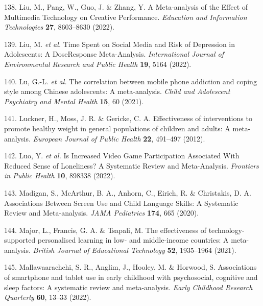 \documentclass[
  english,
  man]{apa6}
\newenvironment{cslreferences}%
  {}%
  {\par}
\begin{document}
\begin{cslreferences}
\leavevmode\hypertarget{ref-liuMetaanalysisEffectMultimedia2022}{}%
138. Liu, M., Pang, W., Guo, J. \& Zhang, Y. A Meta-analysis of the Effect of Multimedia Technology on Creative Performance. \emph{Education and Information Technologies} \textbf{27}, 8603--8630 (2022).

\leavevmode\hypertarget{ref-liuTimeSpentSocial2022}{}%
139. Liu, M. \emph{et al.} Time Spent on Social Media and Risk of Depression in Adolescents: A DoseResponse Meta-Analysis. \emph{International Journal of Environmental Research and Public Health} \textbf{19}, 5164 (2022).

\leavevmode\hypertarget{ref-luCorrelationMobilePhone2021}{}%
140. Lu, G.-L. \emph{et al.} The correlation between mobile phone addiction and coping style among Chinese adolescents: A meta-analysis. \emph{Child and Adolescent Psychiatry and Mental Health} \textbf{15}, 60 (2021).

\leavevmode\hypertarget{ref-lucknerEffectivenessInterventionsPromote2012}{}%
141. Luckner, H., Moss, J. R. \& Gericke, C. A. Effectiveness of interventions to promote healthy weight in general populations of children and adults: A meta-analysis. \emph{European Journal of Public Health} \textbf{22}, 491--497 (2012).

\leavevmode\hypertarget{ref-luoIncreasedVideoGame2022}{}%
142. Luo, Y. \emph{et al.} Is Increased Video Game Participation Associated With Reduced Sense of Loneliness? A Systematic Review and Meta-Analysis. \emph{Frontiers in Public Health} \textbf{10}, 898338 (2022).

\leavevmode\hypertarget{ref-madiganAssociationsScreenUse2020}{}%
143. Madigan, S., McArthur, B. A., Anhorn, C., Eirich, R. \& Christakis, D. A. Associations Between Screen Use and Child Language Skills: A Systematic Review and Meta-analysis. \emph{JAMA Pediatrics} \textbf{174}, 665 (2020).

\leavevmode\hypertarget{ref-majorEffectivenessTechnologySupported2021}{}%
144. Major, L., Francis, G. A. \& Tsapali, M. The effectiveness of technology-supported personalised learning in low- and middle-income countries: A meta-analysis. \emph{British Journal of Educational Technology} \textbf{52}, 1935--1964 (2021).

\leavevmode\hypertarget{ref-mallawaarachchiAssociationsSmartphoneTablet2022}{}%
145. Mallawaarachchi, S. R., Anglim, J., Hooley, M. \& Horwood, S. Associations of smartphone and tablet use in early childhood with psychosocial, cognitive and sleep factors: A systematic review and meta-analysis. \emph{Early Childhood Research Quarterly} \textbf{60}, 13--33 (2022).


\end{cslreferences}
\end{document}
